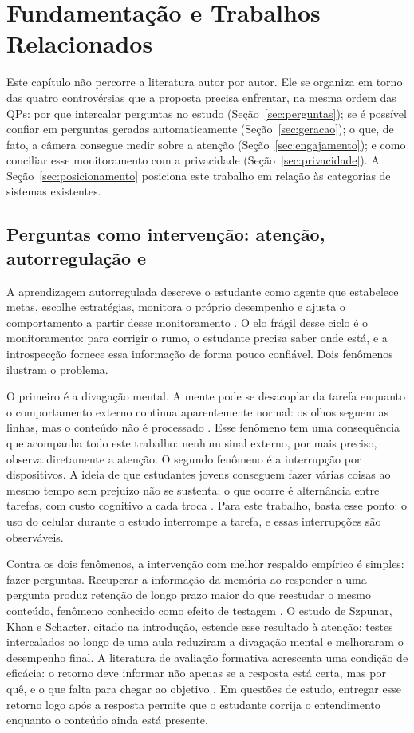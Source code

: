 \chapter{\label{chap:fund}Fundamentação e Trabalhos Relacionados}

Este capítulo não percorre a literatura autor por autor. Ele se organiza em torno das quatro controvérsias que a proposta precisa enfrentar, na mesma ordem das QPs: por que intercalar perguntas no estudo (Seção~\ref{sec:perguntas}); se é possível confiar em perguntas geradas automaticamente (Seção~\ref{sec:geracao}); o que, de fato, a câmera consegue medir sobre a atenção (Seção~\ref{sec:engajamento}); e como conciliar esse monitoramento com a privacidade (Seção~\ref{sec:privacidade}). A Seção~\ref{sec:posicionamento} posiciona este trabalho em relação às categorias de sistemas existentes.

\section{\label{sec:perguntas}Perguntas como intervenção: atenção, autorregulação e }

A aprendizagem autorregulada descreve o estudante como agente que estabelece metas, escolhe estratégias, monitora o próprio desempenho e ajusta o comportamento a partir desse monitoramento \cite{Zim02}. O elo frágil desse ciclo é o monitoramento: para corrigir o rumo, o estudante precisa saber onde está, e a introspecção fornece essa informação de forma pouco confiável. Dois fenômenos ilustram o problema.

O primeiro é a divagação mental. A mente pode se desacoplar da tarefa enquanto o comportamento externo continua aparentemente normal: os olhos seguem as linhas, mas o conteúdo não é processado \cite{SS06}. Esse fenômeno tem uma consequência que acompanha todo este trabalho: nenhum sinal externo, por mais preciso, observa diretamente a atenção. O segundo fenômeno é a interrupção por dispositivos. A ideia de que estudantes jovens conseguem fazer várias coisas ao mesmo tempo sem prejuízo não se sustenta; o que ocorre é alternância entre tarefas, com custo cognitivo a cada troca \cite{KDB17}. Para este trabalho, basta esse ponto: o uso do celular durante o estudo interrompe a tarefa, e essas interrupções são observáveis.

Contra os dois fenômenos, a intervenção com melhor respaldo empírico é simples: fazer perguntas. Recuperar a informação da memória ao responder a uma pergunta produz retenção de longo prazo maior do que reestudar o mesmo conteúdo, fenômeno conhecido como efeito de testagem \cite{RK06}. O estudo de Szpunar, Khan e Schacter, citado na introdução, estende esse resultado à atenção: testes intercalados ao longo de uma aula  reduziram a divagação mental e melhoraram o desempenho final. A literatura de avaliação formativa acrescenta uma condição de eficácia: o retorno deve informar não apenas se a resposta está certa, mas por quê, e o que falta para chegar ao objetivo \cite{BW98}. Em questões de estudo, entregar esse retorno logo após a resposta permite que o estudante corrija o entendimento enquanto o conteúdo ainda está presente.

